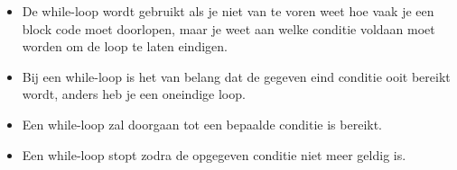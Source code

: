 \begin{itemize}
\item De while-loop wordt gebruikt als je niet van te voren weet hoe vaak je een block code moet doorlopen, maar je weet aan welke conditie voldaan moet worden om de loop te laten eindigen.
\item Bij een while-loop is het van belang dat de gegeven eind conditie ooit bereikt wordt, anders heb je een oneindige loop.
\item Een while-loop zal doorgaan tot een bepaalde conditie is bereikt. 
\item Een while-loop stopt zodra de opgegeven conditie niet meer geldig is.
\end{itemize}
